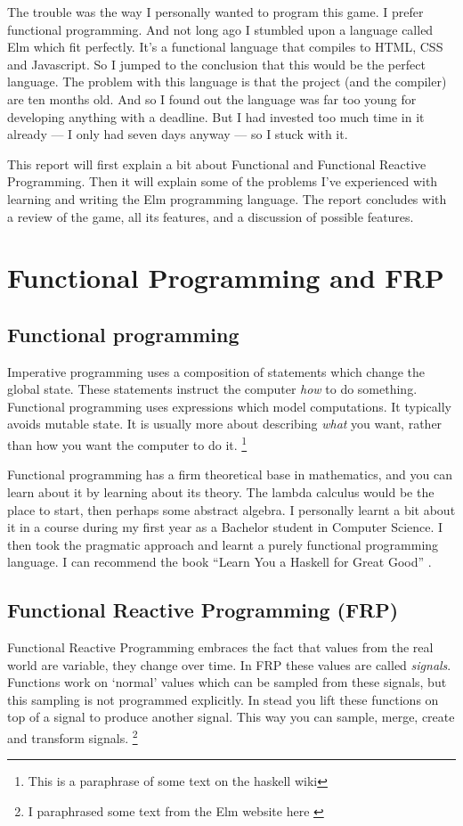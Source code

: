 \documentclass[a4paper]{article}
\begin{document}
The trouble was the way I personally wanted to program this game. I prefer
 functional programming. And not long ago I stumbled upon a language called Elm
 which fit perfectly. It's a functional language that compiles to HTML, CSS and
 Javascript. So I jumped to the conclusion that this would be the perfect
 language. The problem with this language is that the project (and the compiler)
 are ten months old. And so I found out the language was far too young for
 developing anything with a deadline. But I had invested too much time in it
 already --- I only had seven days anyway --- so I stuck with it. 

This report will first explain a bit about Functional and Functional Reactive
 Programming. Then it will explain some of the problems I've experienced with
 learning and writing the Elm programming language. The report concludes with a
 review of the game, all its features, and a discussion of possible features.

\section{Functional Programming and FRP}

\subsection{Functional programming}
Imperative programming uses a composition of statements which change the global
 state. These statements instruct the computer \textit{how} to do something. \\
Functional programming uses expressions which model computations. It typically
 avoids mutable state. It is usually more about describing \textit{what} you
 want, rather than how you want the computer to do it. \footnote{This is a
 paraphrase of some text on the haskell wiki\cite{site:haskell-wiki-fp}}

Functional programming has a firm theoretical base in mathematics, and you can
 learn about it by learning about its theory. The lambda calculus would be the
 place to start, then perhaps some abstract algebra. I personally learnt a bit
 about it in a course during my first year as a Bachelor student in Computer
 Science. I then took the pragmatic approach and learnt a purely functional
 programming language. I can recommend the book ``Learn You a Haskell for Great
 Good'' \cite{book:LYaH}.

\subsection{Functional Reactive Programming (FRP)}
Functional Reactive Programming embraces the fact that values from the real
 world are variable, they change over time. In FRP these values are called
 \textit{signals}. Functions work on `normal' values which can be sampled from
 these signals, but this sampling is not programmed explicitly. In stead you
 lift these functions on top of a signal to produce another signal. This way you
 can sample, merge, create and transform signals. \footnote{I paraphrased some
 text from the Elm website here \cite{site:elm-frp}}
\end{document}
